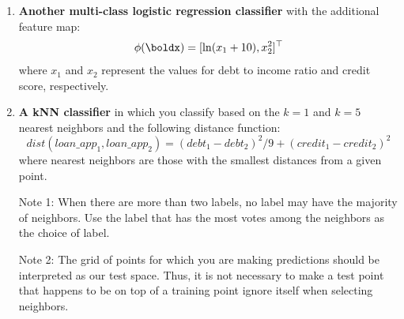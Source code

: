 \documentclass[submit]{../harvardml}
\begin{document}
\begin{problem}
\begin{enumerate}[label=\alph*)]
  \item \textbf{Another multi-class logistic regression classifier} with the additional feature map:
  $$\phi(\boldx) = [\ln (x_1+10), x_2^2]^\top$$
  where $x_1$ and $x_2$ represent the values for debt to income ratio and credit score, respectively.

  \item \textbf{A kNN classifier} in which you classify based on the $k = 1$ and $k = 5$ nearest neighbors and the following distance function: $$dist(loan\_app_1, loan\_app_2) = (debt_1 - debt_2)^2/9 + (credit_1 - credit_2)^2$$
        where nearest neighbors are those with the smallest distances from a given point.

        Note 1: When there are more than two labels, no label may have the
        majority of neighbors.  Use the label that has the most votes among
        the neighbors as the choice of label.

        Note 2: The grid of points for which you are making predictions
        should be interpreted as our test space.  Thus, it is not necessary
        to make a test point that happens to be on top of a training point
        ignore itself when selecting neighbors.

\end{enumerate}
\end{problem}

\newpage
\end{document}
